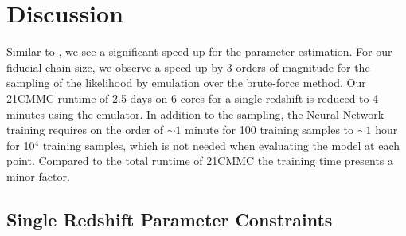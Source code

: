 \documentclass[useAMS,usenatbib]{mnras}
\begin{document}
\section{Discussion} 
\label{sec: Discussion}

Similar to \citet{Kern2017}, we see a significant speed-up for the parameter estimation. 
For our fiducial chain size, we observe a speed up by 3 orders of magnitude for the sampling of the likelihood by emulation over the brute-force method.
Our 21CMMC runtime of 2.5 days on 6 cores for a single redshift is reduced to 4 minutes using the emulator.
In addition to the sampling, the Neural Network training requires on the order of $\sim 1$ minute for 100 training samples to $\sim 1$ hour for 10$^4$ training samples, which is not needed when evaluating the model at each point.
Compared to the total runtime of 21CMMC the training time presents a minor factor. 



\subsection{Single Redshift Parameter Constraints}
\end{document}
